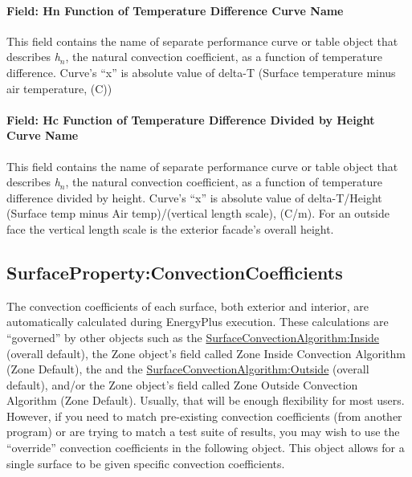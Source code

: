\paragraph{Field: Hn Function of Temperature Difference Curve Name}\label{field-hn-function-of-temperature-difference-curve-name}

This field contains the name of separate performance curve or table object that describes \emph{h\(_{n}\)}, the natural convection coefficient, as a function of temperature difference. Curve's ``x'' is absolute value of delta-T (Surface temperature minus air temperature, (C))

\paragraph{Field: Hc Function of Temperature Difference Divided by Height Curve Name}\label{field-hc-function-of-temperature-difference-divided-by-height-curve-name-1}

This field contains the name of separate performance curve or table object that describes \emph{h\(_{n}\)}, the natural convection coefficient, as a function of temperature difference divided by height. Curve's ``x'' is absolute value of delta-T/Height (Surface temp minus Air temp)/(vertical length scale), (C/m). For an outside face the vertical length scale is the exterior facade's overall height.

\subsection{SurfaceProperty:ConvectionCoefficients}\label{surfacepropertyconvectioncoefficients}

The convection coefficients of each surface, both exterior and interior, are automatically calculated during EnergyPlus execution. These calculations are ``governed'' by other objects such as the \hyperref[surfaceconvectionalgorithminside]{SurfaceConvectionAlgorithm:Inside} (overall default), the Zone object's field called Zone Inside Convection Algorithm (Zone Default), the and the \hyperref[surfaceconvectionalgorithmoutside]{SurfaceConvectionAlgorithm:Outside} (overall default), and/or the Zone object's field called Zone Outside Convection Algorithm (Zone Default). Usually, that will be enough flexibility for most users. However, if you need to match pre-existing convection coefficients (from another program) or are trying to match a test suite of results, you may wish to use the ``override'' convection coefficients in the following object. This object allows for a single surface to be given specific convection coefficients.


